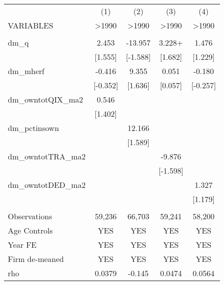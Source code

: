 \documentclass[]{article}
\begin{document}
\begin{tabular}{lcccc} \hline
 & (1) & (2) & (3) & (4) \\
VARIABLES & >1990 & >1990 & >1990 & >1990 \\ \hline
 &  &  &  &  \\
dm\_q & 2.453 & -13.957 & 3.228+ & 1.476 \\
 & [1.555] & [-1.588] & [1.682] & [1.229] \\
dm\_mherf & -0.416 & 9.355 & 0.051 & -0.180 \\
 & [-0.352] & [1.636] & [0.057] & [-0.257] \\
dm\_owntotQIX\_ma2 & 0.546 &  &  &  \\
 & [1.402] &  &  &  \\
dm\_pctinsown &  & 12.166 &  &  \\
 &  & [1.589] &  &  \\
dm\_owntotTRA\_ma2 &  &  & -9.876 &  \\
 &  &  & [-1.598] &  \\
dm\_owntotDED\_ma2 &  &  &  & 1.327 \\
 &  &  &  & [1.179] \\
 &  &  &  &  \\
Observations & 59,236 & 66,703 & 59,241 & 58,200 \\
Age Controls & YES & YES & YES & YES \\
Year FE & YES & YES & YES & YES \\
Firm de-meaned & YES & YES & YES & YES \\
 rho & 0.0379 & -0.145 & 0.0474 & 0.0564 \\ \hline
\end{tabular}
\end{document}
